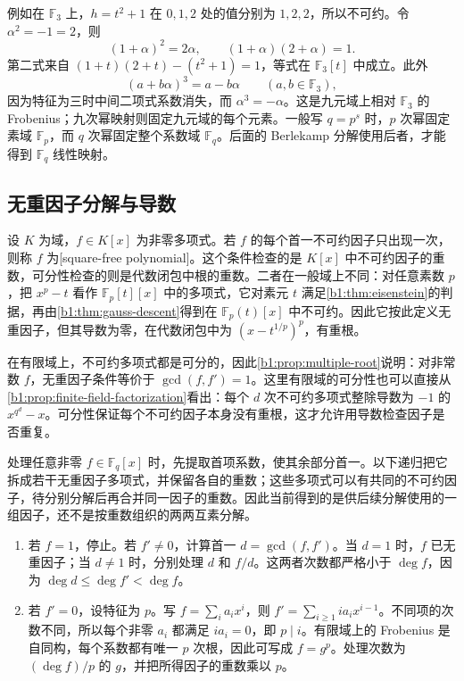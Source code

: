 \ProseParagraphBreak
例如在 \(\mathbb F_3\) 上，\(h=t^2+1\) 在 \(0,1,2\) 处的值分别为 \(1,2,2\)，所以不可约。令 \(\alpha^2=-1=2\)，则
\[
	(1+\alpha)^2=2\alpha,\qquad (1+\alpha)(2+\alpha)=1.
\]
第二式来自 \((1+t)(2+t)-(t^2+1)=1\)，等式在 \(\mathbb F_3[t]\) 中成立。此外
\[
	(a+b\alpha)^3=a-b\alpha\qquad(a,b\in\mathbb F_3),
\]
因为特征为三时中间二项式系数消失，而 \(\alpha^3=-\alpha\)。这是九元域上相对 \(\mathbb F_3\) 的 Frobenius；九次幂映射则固定九元域的每个元素。一般写 \(q=p^s\) 时，\(p\) 次幂固定素域 \(\mathbb F_p\)，而 \(q\) 次幂固定整个系数域 \(\mathbb F_q\)。后面的 Berlekamp 分解使用后者，才能得到 \(\mathbb F_q\) 线性映射。

\subsection{无重因子分解与导数}
\label{b1:subsec:B01:02}

设 \(K\) 为域，\(f\in K[x]\) 为非零多项式。若 \(f\) 的每个首一不可约因子只出现一次，则称 \(f\) 为[square-free polynomial]。这个条件检查的是 \(K[x]\) 中不可约因子的重数，可分性检查的则是代数闭包中根的重数。二者在一般域上不同：对任意素数 \(p\)，把 \(x^p-t\) 看作 \(\mathbb F_p[t][x]\) 中的多项式，它对素元 \(t\) 满足\cref{b1:thm:eisenstein}的判据，再由\cref{b1:thm:gauss-descent}得到在 \(\mathbb F_p(t)[x]\) 中不可约。因此它按此定义无重因子，但其导数为零，在代数闭包中为 \((x-t^{1/p})^p\)，有重根。

\ProseParagraphBreak
在有限域上，不可约多项式都是可分的，因此\cref{b1:prop:multiple-root}说明：对非常数 \(f\)，无重因子条件等价于 \(\gcd(f,f')=1\)。这里有限域的可分性也可以直接从\cref{b1:prop:finite-field-factorization}看出：每个 \(d\) 次不可约多项式整除导数为 \(-1\) 的 \(x^{q^d}-x\)。可分性保证每个不可约因子本身没有重根，这才允许用导数检查因子是否重复。

\ProseParagraphBreak
处理任意非零 \(f\in\mathbb F_q[x]\) 时，先提取首项系数，使其余部分首一。以下递归把它拆成若干无重因子多项式，并保留各自的重数；这些多项式可以有共同的不可约因子，待分别分解后再合并同一因子的重数。因此当前得到的是供后续分解使用的一组因子，还不是按重数组织的两两互素分解。
\begin{enumerate}
	\item 若 \(f=1\)，停止。若 \(f'\ne0\)，计算首一 \(d=\gcd(f,f')\)。当 \(d=1\) 时，\(f\) 已无重因子；当 \(d\ne1\) 时，分别处理 \(d\) 和 \(f/d\)。这两者次数都严格小于 \(\deg f\)，因为 \(\deg d\leq\deg f'<\deg f\)。
	\item 若 \(f'=0\)，设特征为 \(p\)。写 \(f=\sum_i a_ix^i\)，则 \(f'=\sum_{i\geq1}ia_ix^{i-1}\)。不同项的次数不同，所以每个非零 \(a_i\) 都满足 \(ia_i=0\)，即 \(p\mid i\)。有限域上的 Frobenius 是自同构，每个系数都有唯一 \(p\) 次根，因此可写成 \(f=g^p\)。处理次数为 \((\deg f)/p\) 的 \(g\)，并把所得因子的重数乘以 \(p\)。
\end{enumerate}

